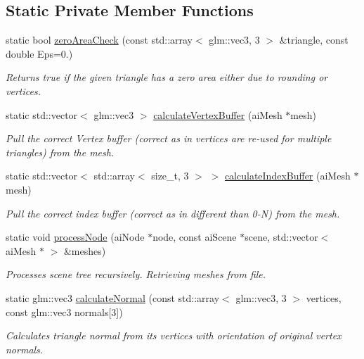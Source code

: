 \subsection*{Static Private Member Functions}
\begin{DoxyCompactItemize}
\item 
static bool \mbox{\hyperlink{classpepr3d_1_1_model_importer_a4d252ce45c2cf7a093d8b067b55ba2ca}{zero\+Area\+Check}} (const std\+::array$<$ glm\+::vec3, 3 $>$ \&triangle, const double Eps=0.)
\begin{DoxyCompactList}\small\item\em Returns true if the given triangle has a zero area either due to rounding or vertices. \end{DoxyCompactList}\item 
\mbox{\label{classpepr3d_1_1_model_importer_a8632c7f0d773fd50da714ef177a3b9f2}} 
static std\+::vector$<$ glm\+::vec3 $>$ \mbox{\hyperlink{classpepr3d_1_1_model_importer_a8632c7f0d773fd50da714ef177a3b9f2}{calculate\+Vertex\+Buffer}} (ai\+Mesh $\ast$mesh)
\begin{DoxyCompactList}\small\item\em Pull the correct Vertex buffer (correct as in vertices are re-\/used for multiple triangles) from the mesh. \end{DoxyCompactList}\item 
static std\+::vector$<$ std\+::array$<$ size\+\_\+t, 3 $>$ $>$ \mbox{\hyperlink{classpepr3d_1_1_model_importer_aa537966d73404c3f4c463799030a1d2b}{calculate\+Index\+Buffer}} (ai\+Mesh $\ast$mesh)
\begin{DoxyCompactList}\small\item\em Pull the correct index buffer (correct as in different than 0-\/N) from the mesh. \end{DoxyCompactList}\item 
static void \mbox{\hyperlink{classpepr3d_1_1_model_importer_a4594f67b4aa8b90ac1a21e52e1871494}{process\+Node}} (ai\+Node $\ast$node, const ai\+Scene $\ast$scene, std\+::vector$<$ ai\+Mesh $\ast$ $>$ \&meshes)
\begin{DoxyCompactList}\small\item\em Processes scene tree recursively. Retrieving meshes from file. \end{DoxyCompactList}\item 
\mbox{\label{classpepr3d_1_1_model_importer_a9f88ce7372a94ac4682d2918f879ea05}} 
static glm\+::vec3 \mbox{\hyperlink{classpepr3d_1_1_model_importer_a9f88ce7372a94ac4682d2918f879ea05}{calculate\+Normal}} (const std\+::array$<$ glm\+::vec3, 3 $>$ vertices, const glm\+::vec3 normals\mbox{[}3\mbox{]})
\begin{DoxyCompactList}\small\item\em Calculates triangle normal from its vertices with orientation of original vertex normals. \end{DoxyCompactList}\end{DoxyCompactItemize}
